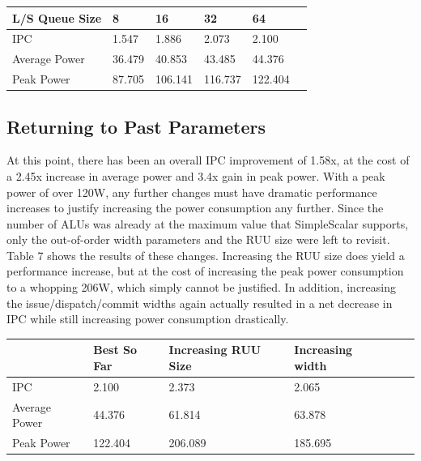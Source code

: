 \documentclass[english]{article}
\begin{document}
\begin{center}
	\vspace{.30cm}
	\begin{tabular}{ | l | l | l | l | l | l |}
		\hline
	 L/S Queue Size & 8 & 16 & 32 & 64 \\ \hline
     IPC & 1.547 & 1.886 & 2.073 & 2.100\\ \hline
     Average Power & 36.479 & 40.853 & 43.485 & 44.376 \\ \hline
     Peak Power & 87.705 & 106.141 & 116.737 & 122.404 \\ \hline
	\end{tabular}
\end{center}

\subsection{Returning to Past Parameters}
At this point, there has been an overall IPC improvement of 1.58x, at the cost of a 2.45x increase in average power and 3.4x gain in peak power. With a peak power of over 120W, any further changes must have dramatic performance increases to justify increasing the power consumption any further. Since the number of ALUs was already at the maximum value that SimpleScalar supports, only the out-of-order width parameters and the RUU size were left to revisit. Table 7 shows the results of these changes. Increasing the RUU size does yield a performance increase, but at the cost of increasing the peak power consumption to a whopping 206W, which simply cannot be justified. In addition, increasing the issue/dispatch/commit widths again actually resulted in a net decrease in IPC while still increasing power consumption drastically.

\begin{center}
	\vspace{.30cm}
	\begin{tabular}{ | l | l | l | l | l | l |}
		\hline
	 & Best So Far & Increasing RUU Size & Increasing width  \\ \hline
     IPC & 2.100 & 2.373 & 2.065 \\ \hline
     Average Power & 44.376 & 61.814 & 63.878 \\ \hline
     Peak Power & 122.404& 206.089 & 185.695  \\ \hline
	\end{tabular}
\end{center}
\end{document}
